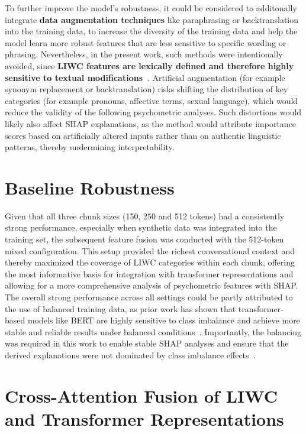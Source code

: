 To further improve the model's robustness, it could be considered to additonally integrate \textbf{data augmentation techniques} like paraphrasing or backtranslation into the training data, to increase the diversity of the training data and help the model learn more robust features that are less sensitive to specific wording or phrasing. Nevertheless, in the present work, such methods were intentionally avoided, since \textbf{LIWC features are lexically defined and therefore highly sensitive to textual modifications~\cite{tausczik2010psychological}}. Artificial augmentation (for example synonym replacement or backtranslation) risks shifting the distribution of key categories (for example pronouns, affective terms, sexual language), which would reduce the validity of the following psychometric analyses. Such distortions would likely also affect SHAP explanations, as the method would attribute importance scores based on artificially altered inputs rather than on authentic linguistic patterns, thereby undermining interpretability. 

\section{Baseline Robustness}
Given that all three chunk sizes (150, 250 and 512 tokens) had a consistently strong performance, especially when synthetic data was integrated into the training set, the subsequent feature fusion was conducted with the 512-token mixed configuration. This setup provided the richest conversational context and thereby maximized the coverage of LIWC categories within each chunk, offering the most informative basis for integration with transformer representations and allowing for a more comprehensive analysis of psychometric features with SHAP. The overall strong performance across all settings could be partly attributed to the use of balanced training data, as prior work has shown that transformer-based models like BERT are highly sensitive to class imbalance and achieve more stable and reliable results under balanced conditions~\cite{henningnlpclassimbalance2023}. Importantly, the balancing was required in this work to enable stable SHAP analyses and ensure that the derived explanations were not dominated by class imbalance effects~\cite{liu2022balancedbackgroundexplanationdata,chen2024interpretable}. 


\section{Cross-Attention Fusion of LIWC and Transformer Representations}

